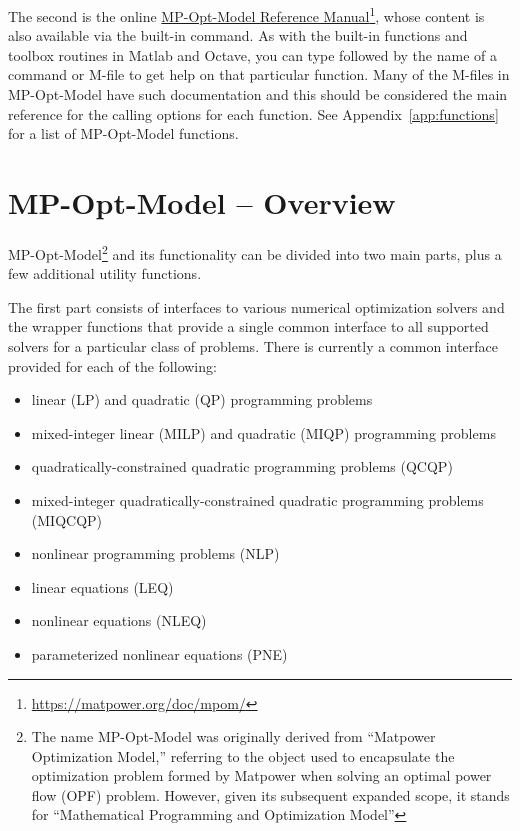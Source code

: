 \documentclass[12pt]{article}
\newcommand{\matlab}[0]{{\sc Matlab}}
\newcommand{\matpower}[0]{{\sc Matpower}}
\newcommand{\mpom}[0]{\mbox{MP-Opt-Model}}
\newcommand{\code}[1]{{\relsize{-0.5}{\tt{{#1}}}}}  %
\numberwithin{equation}{section}
\numberwithin{table}{section}
\numberwithin{figure}{section}
\begin{document}
The second is the online \href{https://matpower.org/doc/mpom/}{\mpom{} Reference Manual}\footnote{\url{https://matpower.org/doc/mpom/}}, whose content is also available via the built-in \code{help} command. As with the built-in functions and toolbox routines in \matlab{} and Octave, you can type \code{help} followed by the name of a command or M-file to get help on that particular function. Many of the M-files in \mpom{} have such documentation and this should be considered the main reference for the calling options for each function. See Appendix~\ref{app:functions} for a list of \mpom{} functions.

\clearpage
\section{\mpom{} -- Overview}
\label{sec:mpom}

\mpom{}\footnote{The name \mpom{} was originally derived from ``\matpower{} Optimization Model,'' referring to the object used to encapsulate the optimization problem formed by \matpower{} when solving an optimal power flow (OPF) problem. However, given its subsequent expanded scope, it stands for ``Mathematical Programming and Optimization Model''} and its functionality can be divided into two main parts, plus a few additional utility functions.

The first part consists of interfaces to various numerical optimization solvers and the wrapper functions that provide a single common interface to all supported solvers for a particular class of problems. There is currently a common interface provided for each of the following:
\begin{itemize}
\item linear (LP) and quadratic (QP) programming problems
\item mixed-integer linear (MILP) and quadratic (MIQP) programming problems
\item quadratically-constrained quadratic programming problems (QCQP)
\item mixed-integer quadratically-constrained quadratic programming problems (MIQCQP)
\item nonlinear programming problems (NLP)
\item linear equations (LEQ)
\item nonlinear equations (NLEQ)
\item parameterized nonlinear equations (PNE)
\end{itemize}
\end{document}
